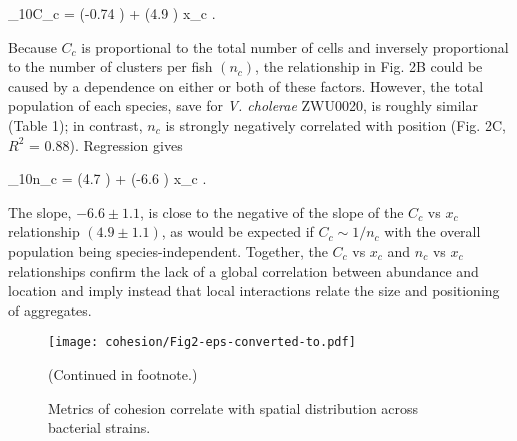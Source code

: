 \be
        	 \log_{10}C_c = (-0.74 ) + (4.9 ) x_c .
\ee	


Because $C_c$ is proportional to the total number of cells and inversely proportional to the number of clusters per fish $(n_c)$, the relationship in Fig. 2B could be caused by a dependence on either or both of these factors. However, the total population of each species, save for \textit{V. cholerae} ZWU0020, is roughly similar (Table 1); in contrast, $n_c$ is strongly negatively correlated with position (Fig. 2C, $R^2$ = 0.88). Regression gives

\be
        \log_{10}n_c = (4.7 ) + (-6.6 ) x_c .
\ee	

The slope, $-6.6 \pm 1.1$, is close to the negative of the slope of the $C_c$ vs $x_c$ relationship $(4.9 \pm 1.1)$, as would be expected if $C_c \sim 1/n_c$ with the overall population being species-independent. Together, the $C_c$ vs $x_c$  and $n_c$ vs $x_c$ relationships confirm the lack of a global correlation between abundance and location and imply instead that local interactions relate the size and positioning of aggregates. 	

\begin{figure}%
	\centerline{
		\texttt{[image: cohesion/Fig2-eps-converted-to.pdf]}}
	\caption{Metrics of cohesion correlate with spatial distribution  across bacterial strains.} {(Continued in footnote.)}
	\label{fig:cohesion_fig2}
\end{figure}

